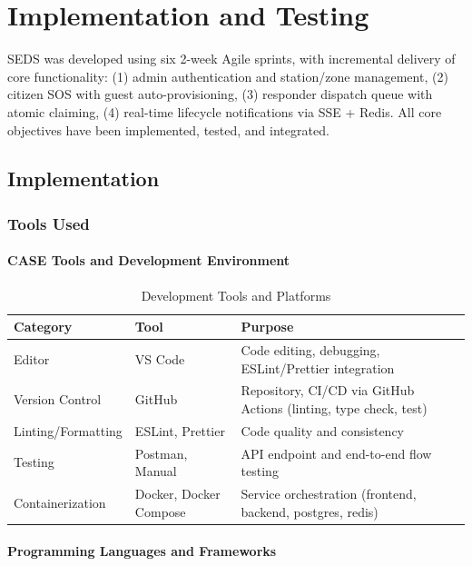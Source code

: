 \chapter{Implementation and Testing}

SEDS was developed using six 2-week Agile sprints, with incremental delivery of core functionality: (1) admin authentication and station/zone management, (2) citizen SOS with guest auto-provisioning, (3) responder dispatch queue with atomic claiming, (4) real-time lifecycle notifications via SSE + Redis. All core objectives have been implemented, tested, and integrated.

\section{Implementation}

\subsection{Tools Used}

\subsubsection{CASE Tools and Development Environment}

\begin{table}[H]
\centering
\caption{Development Tools and Platforms}
\begin{tabularx}{\textwidth}{|X|X|X|}
\hline
\textbf{Category} & \textbf{Tool} & \textbf{Purpose} \\
\hline
Editor & VS Code & Code editing, debugging, ESLint/Prettier integration \\
\hline
Version Control & GitHub & Repository, CI/CD via GitHub Actions (linting, type check, test) \\
\hline
Linting/Formatting & ESLint, Prettier & Code quality and consistency \\
\hline
Testing & Postman, Manual & API endpoint and end-to-end flow testing \\
\hline
Containerization & Docker, Docker Compose & Service orchestration (frontend, backend, postgres, redis) \\
\hline
\end{tabularx}
\label{tab:tools}
\end{table}

\subsubsection{Programming Languages and Frameworks}

